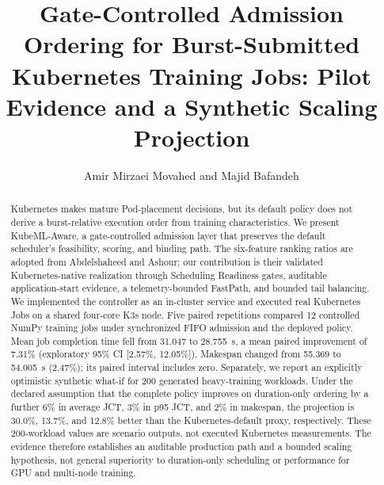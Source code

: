 \documentclass[10pt,journal,compsoc]{IEEEtran}
\newcommand{\system}{KubeML-Aware}
\begin{document}
\title{Gate-Controlled Admission Ordering for Burst-Submitted Kubernetes Training Jobs: Pilot Evidence and a Synthetic Scaling Projection}

\author{Amir Mirzaei Movahed and Majid Bafandeh%
}

\maketitle

\begin{abstract}
Kubernetes makes mature Pod-placement decisions, but its default policy does not derive a burst-relative execution order from training characteristics. We present \system, a gate-controlled admission layer that preserves the default scheduler's feasibility, scoring, and binding path. The six-feature ranking ratios are adopted from Abdelshaheed and Ashour; our contribution is their validated Kubernetes-native realization through Scheduling Readiness gates, auditable application-start evidence, a telemetry-bounded FastPath, and bounded tail balancing. We implemented the controller as an in-cluster service and executed real Kubernetes Jobs on a shared four-core K3s node. Five paired repetitions compared 12 controlled NumPy training jobs under synchronized FIFO admission and the deployed policy. Mean job completion time fell from 31.047 to 28.755~s, a mean paired improvement of 7.31\% (exploratory 95\% CI [2.57\%, 12.05\%]). Makespan changed from 55.369 to 54.005~s (2.47\%); its paired interval includes zero. Separately, we report an explicitly optimistic synthetic what-if for 200 generated heavy-training workloads. Under the declared assumption that the complete policy improves on duration-only ordering by a further 6\% in average JCT, 3\% in p95 JCT, and 2\% in makespan, the projection is 30.0\%, 13.7\%, and 12.8\% better than the Kubernetes-default proxy, respectively. These 200-workload values are scenario outputs, not executed Kubernetes measurements. The evidence therefore establishes an auditable production path and a bounded scaling hypothesis, not general superiority to duration-only scheduling or performance for GPU and multi-node training.
\end{abstract}
\end{document}
